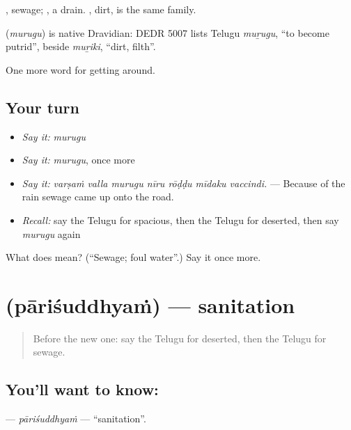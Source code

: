  , sewage;  , a drain. , dirt, is the same family.

\begin{cousinweb}
\textbf{} (\emph{murugu}) is native Dravidian: DEDR 5007 lists Telugu \emph{muṟugu}, \textquotedblleft{}to become putrid\textquotedblright{}, beside \emph{muṟiki}, \textquotedblleft{}dirt, filth\textquotedblright{}.
\end{cousinweb}

\begin{grammarlens}[title={What you've built}]
One more word for getting around.
\end{grammarlens}

\subsection*{Your turn}
\begin{itemize}
\raggedright
  \item \emph{Say it:} \emph{murugu}
  \item \emph{Say it:} \emph{murugu}, once more
  \item \emph{Say it:} \emph{varṣaṁ valla murugu nīru rōḍḍu mīdaku vaccindi.} — Because of the rain sewage came up onto the road.
  \item \emph{Recall:} say the Telugu for spacious, then the Telugu for deserted, then say \emph{murugu} again
\end{itemize}

\begin{tcolorbox}[breakable,colback=teal!4,colframe=teal!35!black,title={Before you move on}]
What does  mean? (\textquotedblleft{}Sewage; foul water\textquotedblright{}.) Say it once more.
\end{tcolorbox}
\section[\texorpdfstring{\te{పారిశుద్ధ్యం} (pāriśuddhyaṁ)}{పారిశుద్ధ్యం (pāriśuddhyaṁ)}]{ (pāriśuddhyaṁ) — sanitation}

\label{lesson:TE-C468-parisuddhyam}



\begin{quote}
Before the new one: say the Telugu for deserted, then the Telugu for sewage.
\end{quote}

\subsection*{You'll want to know: }
\textbf{} — \emph{pāriśuddhyaṁ} — \textquotedblleft{}sanitation\textquotedblright{}.

